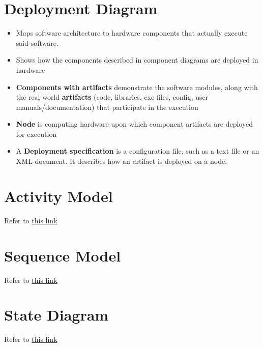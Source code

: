 \documentclass{article}
\begin{document}
\section{Deployment Diagram}
\begin{itemize}
    \item Maps software architecture to hardware components that actually execute said software. 
    
    \item Shows how the components described in component diagrams are deployed in hardware
    
    \item \textbf{Components with artifacts} demonstrate the software modules, along with the real world \textbf{artifacts} (code, libraries, exe files, config, user manuals/documentation) that participate in the execution
    
    \item \textbf{Node} is computing hardware upon which component artifacts are deployed for execution
    
    \item A \textbf{Deployment specification} is a  configuration file, such as a text file or an XML document. It describes how an artifact is deployed on a node.
\end{itemize}

\section{Activity Model}
Refer to \href{https://www.geeksforgeeks.org/unified-modeling-language-uml-activity-diagrams/}{this link}

\section{Sequence Model}
Refer to \href{https://www.geeksforgeeks.org/unified-modeling-language-uml-sequence-diagrams/}{this link}

\section{State Diagram}
Refer to \href{https://www.geeksforgeeks.org/unified-modeling-language-uml-state-diagrams/}{this link}
\end{document}
